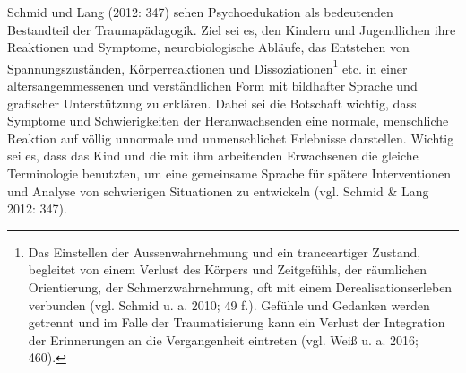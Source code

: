 Schmid und Lang (2012: 347) sehen Psychoedukation als bedeutenden Bestandteil der Traumap{\"a}dagogik. Ziel sei es, den Kindern und Jugendlichen ihre Reaktionen und Symptome, neurobiologische Abl{\"a}ufe, das Entstehen von Spannungszust{\"a}nden, K{\"o}rperreaktionen und Dissoziationen\footnote{Das Einstellen der Aussenwahrnehmung und ein tranceartiger Zustand, begleitet von einem Verlust des Körpers und Zeitgefühls, der räumlichen Orientierung, der Schmerzwahrnehmung, oft mit einem Derealisationserleben verbunden (vgl. Schmid u. a. 2010; 49 f.). Gefühle und Gedanken werden getrennt und im Falle der Traumatisierung kann ein Verlust der Integration der Erinnerungen an die Vergangenheit eintreten (vgl. Weiß u. a. 2016; 460).} etc. in einer altersangemmessenen und verständlichen Form mit bildhafter Sprache und grafischer Unterstützung zu erklären. Dabei sei die Botschaft wichtig, dass Symptome und Schwierigkeiten der Heranwachsenden eine normale, menschliche Reaktion auf v{\"o}llig unnormale und unmenschlichet Erlebnisse darstellen. Wichtig sei es, dass das Kind und die mit ihm arbeitenden Erwachsenen die gleiche Terminologie benutzten, um eine gemeinsame Sprache für spätere Interventionen und Analyse von schwierigen Situationen zu entwickeln (vgl. Schmid \& Lang 2012: 347).

